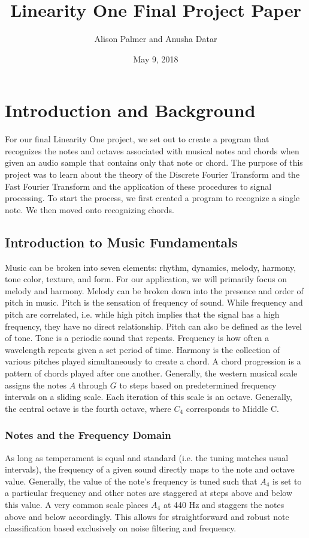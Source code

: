 \documentclass{article}
\title{Linearity One Final Project Paper}
\author{Alison Palmer and Anusha Datar}
\date{May 9, 2018}
\begin{document}
\maketitle

\section{Introduction and Background}
For our final Linearity One project, we set out to create a program that recognizes the notes and octaves associated with musical notes and chords when given an audio sample that contains only that note or chord. The purpose of this project was to learn about the theory of the Discrete Fourier Transform and the Fast Fourier Transform and the application of these procedures to signal processing. To start the process, we first created a program to recognize a single note. We then moved onto recognizing chords. 

\subsection{Introduction to Music Fundamentals}
Music can be broken into seven elements: rhythm, dynamics, melody, harmony, tone color, texture, and form. For our application, we will primarily focus on melody and harmony. Melody can be broken down into the presence and order of pitch in music. Pitch is the sensation of frequency of sound. While frequency and pitch are correlated, i.e. while high pitch implies that the signal has a high frequency, they have no direct relationship. Pitch can also be defined as the level of tone. Tone is a periodic sound that repeats. Frequency is how often a wavelength repeats given a set period of time. Harmony is the collection of various pitches played simultaneously to create a chord. A chord progression is a pattern of chords played after one another. 
Generally, the western musical scale assigns the notes $A$ through $G$ to steps based on predetermined frequency intervals on a sliding scale. Each iteration of this scale is an octave. Generally, the central octave is the fourth octave, where $C_4$ corresponds to Middle C.

\subsubsection{Notes and the Frequency Domain}
As long as temperament is equal and standard (i.e. the tuning matches usual intervals), the frequency of a given sound directly maps to the note and octave value. Generally, the value of the note's frequency is tuned such that $A_4$ is set to a particular frequency and other notes are staggered at steps above and below this value. A very common scale places $A_4$ at 440 Hz and staggers the notes above and below accordingly. This allows for straightforward and robust note classification based exclusively on noise filtering and frequency.
\end{document}
